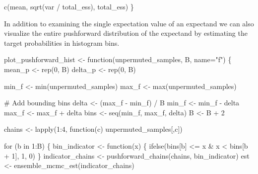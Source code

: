 \documentclass[
  letterpaper,
  DIV=11,
  numbers=noendperiod]{scrartcl}
\newenvironment{Shaded}{\begin{snugshade}}{\end{snugshade}}
\newcommand{\AttributeTok}[1]{\textcolor[rgb]{0.40,0.45,0.13}{#1}}
\newcommand{\CommentTok}[1]{\textcolor[rgb]{0.37,0.37,0.37}{#1}}
\newcommand{\ControlFlowTok}[1]{\textcolor[rgb]{0.00,0.23,0.31}{#1}}
\newcommand{\DecValTok}[1]{\textcolor[rgb]{0.68,0.00,0.00}{#1}}
\newcommand{\FunctionTok}[1]{\textcolor[rgb]{0.28,0.35,0.67}{#1}}
\newcommand{\NormalTok}[1]{\textcolor[rgb]{0.00,0.23,0.31}{#1}}
\newcommand{\OtherTok}[1]{\textcolor[rgb]{0.00,0.23,0.31}{#1}}
\newcommand{\SpecialCharTok}[1]{\textcolor[rgb]{0.37,0.37,0.37}{#1}}
\newcommand{\StringTok}[1]{\textcolor[rgb]{0.13,0.47,0.30}{#1}}
\begin{document}
\begin{Shaded}
\begin{Highlighting}[]
  \FunctionTok{c}\NormalTok{(mean, }\FunctionTok{sqrt}\NormalTok{(var }\SpecialCharTok{/}\NormalTok{ total\_ess), total\_ess)}
\NormalTok{\}}
\end{Highlighting}
\end{Shaded}

In addition to examining the single expectation value of an expectand we
can also visualize the entire pushforward distribution of the expectand
by estimating the target probabilities in histogram bins.

\begin{Shaded}
\begin{Highlighting}[]
\NormalTok{plot\_pushforward\_hist }\OtherTok{\textless{}{-}} \ControlFlowTok{function}\NormalTok{(unpermuted\_samples, B, }\AttributeTok{name=}\StringTok{"f"}\NormalTok{) \{}
\NormalTok{  mean\_p }\OtherTok{\textless{}{-}} \FunctionTok{rep}\NormalTok{(}\DecValTok{0}\NormalTok{, B)}
\NormalTok{  delta\_p }\OtherTok{\textless{}{-}} \FunctionTok{rep}\NormalTok{(}\DecValTok{0}\NormalTok{, B)}

\NormalTok{  min\_f }\OtherTok{\textless{}{-}} \FunctionTok{min}\NormalTok{(unpermuted\_samples)}
\NormalTok{  max\_f }\OtherTok{\textless{}{-}} \FunctionTok{max}\NormalTok{(unpermuted\_samples)}

  \CommentTok{\# Add bounding bins}
\NormalTok{  delta }\OtherTok{\textless{}{-}}\NormalTok{ (max\_f }\SpecialCharTok{{-}}\NormalTok{ min\_f) }\SpecialCharTok{/}\NormalTok{ B}
\NormalTok{  min\_f }\OtherTok{\textless{}{-}}\NormalTok{ min\_f }\SpecialCharTok{{-}}\NormalTok{ delta}
\NormalTok{  max\_f }\OtherTok{\textless{}{-}}\NormalTok{ max\_f }\SpecialCharTok{+}\NormalTok{ delta}
\NormalTok{  bins }\OtherTok{\textless{}{-}} \FunctionTok{seq}\NormalTok{(min\_f, max\_f, delta)}
\NormalTok{  B }\OtherTok{\textless{}{-}}\NormalTok{ B }\SpecialCharTok{+} \DecValTok{2}

\NormalTok{  chains }\OtherTok{\textless{}{-}} \FunctionTok{lapply}\NormalTok{(}\DecValTok{1}\SpecialCharTok{:}\DecValTok{4}\NormalTok{, }\ControlFlowTok{function}\NormalTok{(c) unpermuted\_samples[,c])}

  \ControlFlowTok{for}\NormalTok{ (b }\ControlFlowTok{in} \DecValTok{1}\SpecialCharTok{:}\NormalTok{B) \{}
\NormalTok{    bin\_indicator }\OtherTok{\textless{}{-}} \ControlFlowTok{function}\NormalTok{(x) \{}
      \FunctionTok{ifelse}\NormalTok{(bins[b] }\SpecialCharTok{\textless{}=}\NormalTok{ x }\SpecialCharTok{\&}\NormalTok{ x }\SpecialCharTok{\textless{}}\NormalTok{ bins[b }\SpecialCharTok{+} \DecValTok{1}\NormalTok{], }\DecValTok{1}\NormalTok{, }\DecValTok{0}\NormalTok{)}
\NormalTok{    \}}
\NormalTok{    indicator\_chains }\OtherTok{\textless{}{-}} \FunctionTok{pushforward\_chains}\NormalTok{(chains, bin\_indicator)}
\NormalTok{    est }\OtherTok{\textless{}{-}} \FunctionTok{ensemble\_mcmc\_est}\NormalTok{(indicator\_chains)}
  

\end{Highlighting}
\end{Shaded}
\end{document}

